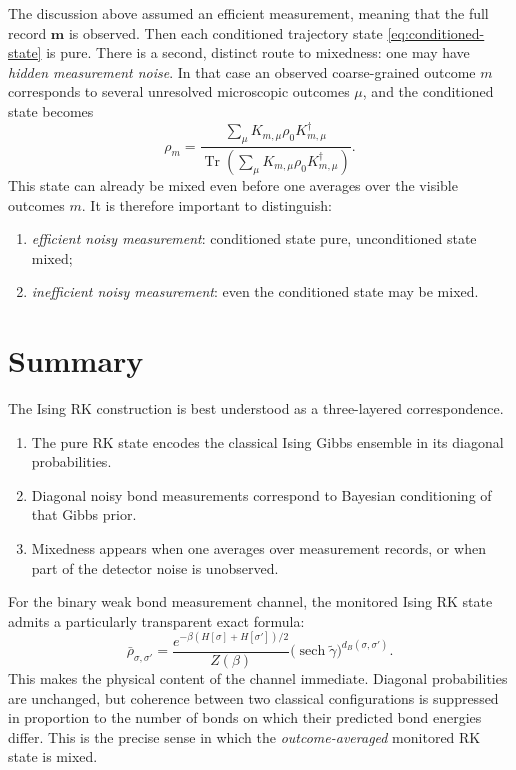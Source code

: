 \documentclass[11pt]{article}
\newcommand{\sech}{\operatorname{sech}}
\DeclareMathOperator{\Tr}{Tr}
\begin{document}
The discussion above assumed an efficient measurement, meaning that the full record $\bm m$ is observed. Then each conditioned trajectory state \eqref{eq:conditioned-state} is pure. There is a second, distinct route to mixedness: one may have \emph{hidden measurement noise}. In that case an observed coarse-grained outcome $m$ corresponds to several unresolved microscopic outcomes $\mu$, and the conditioned state becomes
\begin{equation}
\rho_m
=
\frac{\sum_\mu K_{m,\mu}\rho_0 K_{m,\mu}^\dagger}
{\Tr\!\left(\sum_\mu K_{m,\mu}\rho_0 K_{m,\mu}^\dagger\right)}.
\label{eq:inefficient-condition}
\end{equation}
This state can already be mixed even before one averages over the visible outcomes $m$. It is therefore important to distinguish:
\begin{enumerate}[label=\arabic*.]
  \item \emph{efficient noisy measurement}: conditioned state pure, unconditioned state mixed;
  \item \emph{inefficient noisy measurement}: even the conditioned state may be mixed.
\end{enumerate}

\section{Summary}

The Ising RK construction is best understood as a three-layered correspondence.
\begin{enumerate}[label=\arabic*.]
  \item The pure RK state encodes the classical Ising Gibbs ensemble in its diagonal probabilities.
  \item Diagonal noisy bond measurements correspond to Bayesian conditioning of that Gibbs prior.
  \item Mixedness appears when one averages over measurement records, or when part of the detector noise is unobserved.
\end{enumerate}

For the binary weak bond measurement channel, the monitored Ising RK state admits a particularly transparent exact formula:
\begin{equation}
\bar\rho_{\sigma,\sigma'}
=
\frac{e^{-\beta(H[\sigma]+H[\sigma'])/2}}{Z(\beta)}
\bigl(\sech\tilde\gamma\bigr)^{d_B(\sigma,\sigma')}.
\end{equation}
This makes the physical content of the channel immediate. Diagonal probabilities are unchanged, but coherence between two classical configurations is suppressed in proportion to the number of bonds on which their predicted bond energies differ. This is the precise sense in which the \emph{outcome-averaged} monitored RK state is mixed.
\end{document}
